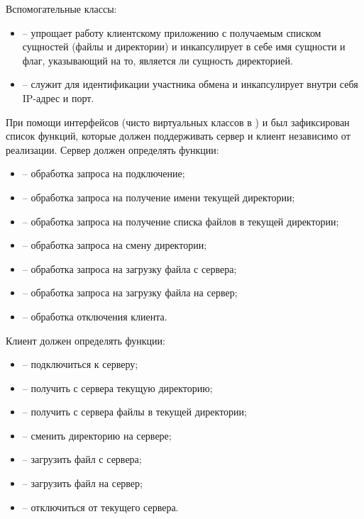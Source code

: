 \noindent Вспомогательные классы:
\begin{itemize}
	\item {} -- упрощает работу клиентскому приложению с получаемым списком сущностей (файлы и директории) и инкапсулирует в себе имя сущности и флаг, указывающий на то, является ли сущность директорией.
	\item {} -- служит для идентификации участника обмена и инкапсулирует внутри себя IP-адрес и порт.
\end{itemize}

\noindent При помощи интерфейсов (чисто виртуальных классов в )  и  был зафиксирован список функций, которые должен поддерживать сервер и клиент независимо от реализации. Сервер должен определять функции:
\begin{itemize}
	\item {} -- обработка запроса на подключение;
	\item {} -- обработка запроса на получение имени текущей директории;
	\item {} -- обработка запроса на получение списка файлов в текущей директории;
	\item {} -- обработка запроса на смену директории;
	\item {} -- обработка запроса на загрузку файла с сервера;
	\item {} -- обработка запроса на загрузку файла на сервер;
	\item {} -- обработка отключения клиента.
\end{itemize}

\noindent Клиент должен определять функции:
\begin{itemize}
	\item {} -- подключиться к серверу;
	\item {} -- получить с сервера текущую директорию;
	\item {} -- получить с сервера файлы в текущей директории;
	\item {} -- сменить директорию на сервере;
	\item {} -- загрузить файл с сервера;
	\item {} -- загрузить файл на сервер; 
	\item {} -- отключиться от текущего сервера.
\end{itemize}

